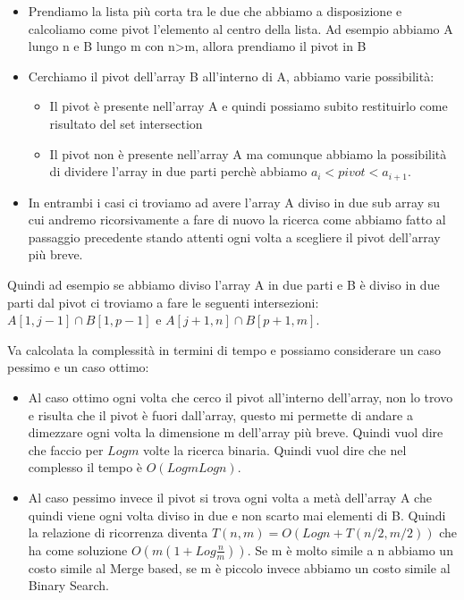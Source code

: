 \documentclass[14pt]{extreport}
\begin{document}
\begin{itemize}
\item Prendiamo la lista più corta tra le due che abbiamo a disposizione e calcoliamo come pivot l'elemento al centro della lista. Ad esempio abbiamo A lungo n e B lungo m con n>m, allora prendiamo il pivot in B
\item Cerchiamo il pivot dell'array B all'interno di A, abbiamo varie possibilità:
    \begin{itemize}
    \item Il pivot è presente nell'array A e quindi possiamo subito restituirlo come risultato del set intersection
    \item Il pivot non è presente nell'array A ma comunque abbiamo la possibilità di dividere l'array in due parti perchè abbiamo $a_i < pivot < a_{i+1}$.
    \end{itemize}
\item In entrambi i casi ci troviamo ad avere l'array A diviso in due sub array su cui andremo ricorsivamente a fare di nuovo la ricerca come abbiamo fatto al passaggio precedente stando attenti ogni volta a scegliere il pivot dell'array più breve.
\end{itemize}

Quindi ad esempio se abbiamo diviso l'array A in due parti e B è diviso in due parti dal pivot ci troviamo a fare le seguenti intersezioni:
$A[1,j-1] \cap B[1,p-1]$ e $A[j+1,n] \cap B[p+1,m]$.

Va calcolata la complessità in termini di tempo e possiamo considerare un caso pessimo e un caso ottimo:
\begin{itemize}
\item Al caso ottimo ogni volta che cerco il pivot all'interno dell'array, non lo trovo e risulta che il pivot è fuori dall'array, questo mi permette di andare a dimezzare ogni volta la dimensione m dell'array più breve. Quindi vuol dire che faccio per $Log m$ volte la ricerca binaria. Quindi vuol dire che nel complesso il tempo è $O(Log m Log n)$.
\item Al caso pessimo invece il pivot si trova ogni volta a metà dell'array A che quindi viene ogni volta diviso in due e non scarto mai elementi di B. Quindi la relazione di ricorrenza diventa $T(n,m) = O(Log n + T(n/2,m/2))$ che ha come soluzione $O(m(1+Log\frac{n}{m}))$.
Se m è molto simile a n abbiamo un costo simile al Merge based, se m è piccolo invece abbiamo un costo simile al Binary Search.
\end{itemize}
\end{document}
